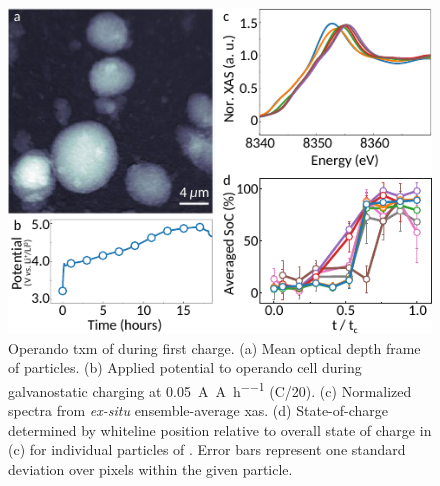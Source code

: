 \documentclass{article}
\begin{document}
\newpage
\begin{figure}[!h]
  \includegraphics{figures/nca_txm.pdf}
  \caption{Operando \gls{txm} of \nca{} during first charge. (a) Mean
    optical depth frame of \nca{} particles. (b) Applied potential to
    operando cell during galvanostatic charging at
    \SI{0.05}{\ampere\per\ampere\per\hour} (C/20). (c) Normalized spectra
    from \emph{ex-situ} ensemble-average \gls{xas}. (d)
    State-of-charge determined by whiteline position relative to
    overall state of charge in (c) for individual particles of
    \nca{}. Error bars represent one standard deviation over pixels
    within the given particle.}
  \label{fig:txm-nca}
\end{figure}
\end{document}

